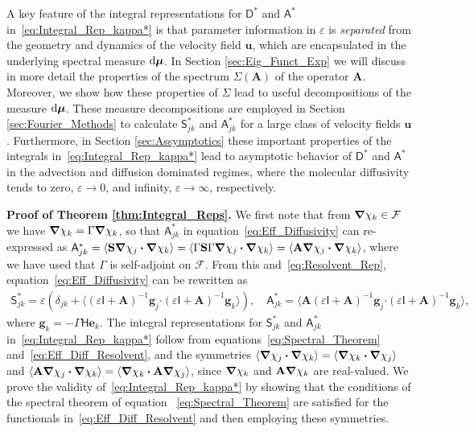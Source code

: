 \documentclass[leqno,onefignum,onetabnum]{siamltex1213}
\renewcommand{\d}{\mathrm{d}}
\newcommand{\Sb}{\mathbf{S}}
\newcommand{\Ab}{\mathbf{A}}
\newcommand{\Fc}{\mathcal{F}}
\newcommand{\Dm}{\mathsf{D}}
\newcommand{\Hm}{\mathsf{H}}
\newcommand{\Sm}{\mathsf{S}}
\newcommand{\Am}{\mathsf{A}}
\newcommand{\Ib}{\mathsf{I}}
\newcommand\bmu{\mbox{\boldmath${\mu}$}}
\newcommand\bnabla{\mbox{\boldmath${\nabla}$}}
\providecommand\bcdot{\boldsymbol{\cdot}}
\newcommand{\vecg}{\boldsymbol{g}}
\newcommand{\vecu}{\boldsymbol{u}}
\newcommand{\vece}{\boldsymbol{e}}
\begin{document}
A key feature of the integral representations for $\Dm^*$ and
$\Am^*$ in~\eqref{eq:Integral_Rep_kappa*} is that parameter
information in $\varepsilon$ is \emph{separated} from the geometry and dynamics
of the velocity field $\vecu $, which are encapsulated in the
underlying spectral measure $\d\bmu$. In Section
\ref{sec:Eig_Funct_Exp} we will discuss in more detail the properties
of the spectrum $\Sigma(\Ab)$ of the operator $\Ab$. Moreover, we show how
these properties of $\Sigma$ lead to useful decompositions of the
measure $\d\bmu$. These measure decompositions are employed in Section 
\ref{sec:Fourier_Methods} to calculate $\Sm^*_{jk}$ and $\Am^*_{jk}$ for a
large class of velocity fields $\vecu $. Furthermore, in Section
\ref{sec:Assymptotics} these important properties of the integrals
in~\eqref{eq:Integral_Rep_kappa*} lead to asymptotic behavior of 
$\Dm^*$ and $\Am^*$ in the advection and diffusion dominated
regimes, where the molecular diffusivity tends to zero, $\varepsilon\to0$, and
infinity, $\varepsilon\to\infty$, respectively.      



\textbf{Proof of Theorem \ref{thm:Integral_Reps}.}\hspace{1ex}
%
We first note that from $\bnabla \chi_k\in\Fc$ we have 
$\bnabla \chi_k=\Gamma\bnabla \chi_k$, so that $\Am^*_{jk}$ in
equation~\eqref{eq:Eff_Diffusivity} can re-expressed as 
$\Am^*_{jk}=\langle\Sb\bnabla \chi_j\bcdot\bnabla \chi_k\rangle=\langle\Gamma\Sb\Gamma\bnabla \chi_j\bcdot\bnabla \chi_k\rangle  
=\langle\Ab\bnabla \chi_j\bcdot\bnabla \chi_k\rangle$, where we have used that $\Gamma$ is
self-adjoint on $\Fc$. From this and~\eqref{eq:Resolvent_Rep},
equation~\eqref{eq:Eff_Diffusivity} can be rewritten as
%
\begin{align}\label{eq:Eff_Diff_Resolvent}
 \Sm^*_{jk}=\varepsilon\left(\delta_{jk}+\langle(\varepsilon\Ib+\Ab)^{-1}\vecg_j\bcdot(\varepsilon\Ib+\Ab)^{-1}\vecg_k\rangle\right), \quad
 \Am^*_{jk}=\langle\Ab(\varepsilon\Ib+\Ab)^{-1}\vecg_j\bcdot(\varepsilon\Ib+\Ab)^{-1}\vecg_k\rangle,
\end{align}
%
where $\vecg_k=-\Gamma\Hm\vece _k$. The integral representations
for $\Sm^*_{jk}$ and $\Am^*_{jk}$ in~\eqref{eq:Integral_Rep_kappa*} follow
from equations~\eqref{eq:Spectral_Theorem}
and~\eqref{eq:Eff_Diff_Resolvent}, and the symmetries 
$\langle\bnabla \chi_j\bcdot\bnabla \chi_k\rangle=\langle\bnabla \chi_k\bcdot\bnabla \chi_j\rangle$ and 
$\langle\Ab\bnabla \chi_j\bcdot\bnabla \chi_k\rangle=\langle\bnabla \chi_k\bcdot\Ab\bnabla \chi_j\rangle$, since
$\bnabla \chi_k$ and $\Ab\bnabla \chi_k$ are real-valued. We prove the
validity of~\eqref{eq:Integral_Rep_kappa*} by showing that the
conditions of the spectral theorem of equation
~\eqref{eq:Spectral_Theorem} are satisfied for the functionals
in~\eqref{eq:Eff_Diff_Resolvent} and then employing these symmetries.     
\end{document}
